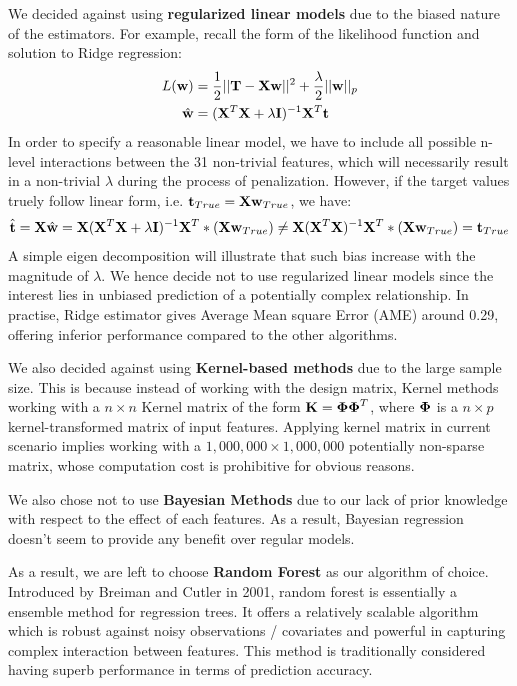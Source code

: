 \documentclass[11pt]{article}
\theoremstyle{definition}
\begin{document}
We decided against using \textbf{regularized linear models} due to the biased nature of the estimators. For example, recall the form of the likelihood function and solution to Ridge regression:
\begin{align*}
L({\bf w}) &= \frac{1}{2} || {\bf T} - {\bf X}{\bf w}||^2 + \frac{\lambda}{2}||{\bf w}||_p\\
\hat{{\bf w}} &= ({\bf X}^T{\bf X} + \lambda {\bf I})^{-1}{\bf X}^T{\bf t}
\end{align*}
In order to specify a reasonable linear model, we have to include all possible n-level interactions between the 31 non-trivial features, which will necessarily result in a non-trivial $\lambda$ during the process of penalization. However, if the target values truely follow linear form, i.e. ${\bf t}_{True} = {\bf X} {\bf w}_{True}$, we have:
\begin{align*}
\hat{{\bf t}} = {\bf X}\hat{{\bf w}} =  {\bf X}({\bf X}^T{\bf X} + \lambda {\bf I})^{-1}{\bf X}^T * ({\bf X} {\bf w}_{True}) \neq  {\bf X}({\bf X}^T{\bf X})^{-1}{\bf X}^T * ({\bf X} {\bf w}_{True}) = {\bf t}_{True} 
\end{align*}
A simple eigen decomposition will illustrate that such bias increase with the magnitude of $\lambda$. We hence decide not to use regularized linear models since the interest lies in unbiased prediction of a potentially complex relationship. In practise, Ridge estimator gives Average Mean square Error (AME) around 0.29, offering inferior performance compared to the other algorithms.

We also decided against using \textbf{Kernel-based methods} due to the large sample size. This is because instead of working with the design matrix, Kernel methods working with a $n \times n$ Kernel matrix of the form ${\bf K} = \boldsymbol{\Phi} \boldsymbol{\Phi}^T$, where $\boldsymbol{\Phi}$ is a $n \times p$ kernel-transformed matrix of input features. Applying kernel matrix in current scenario implies working with a $1,000,000 \times 1,000,000$ potentially non-sparse matrix, whose computation cost is prohibitive for obvious reasons. 

We also chose not to use \textbf{Bayesian Methods} due to our lack of prior knowledge with respect to the effect of each features. As a result, Bayesian regression doesn't seem to provide any benefit over regular models.

As a result, we are left to choose \textbf{Random Forest} as our algorithm of choice. Introduced by Breiman and Cutler in 2001, random forest is essentially a ensemble method for regression trees. It offers a relatively  scalable algorithm which is robust against noisy observations / covariates and powerful in capturing complex interaction between features. This method is traditionally considered having superb performance in terms of prediction accuracy.
\end{document}
